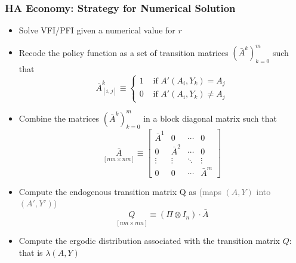 \documentclass[10pt, aspectratio=1610, natbib, handout]{beamer}
\newcommand{\dimmer}[1]{\textcolor{dimgray}{#1}}
\begin{document}
  \begin{frame}
    \frametitle{HA Economy: Strategy for Numerical Solution}

    \begin{itemize}
      \item Solve VFI/PFI given a numerical value for $r$
      \item Recode the policy function as a set of transition matrices ${(\bar{A}^k)}_{k=0}^{m}$ such that
        \begin{equation*}
          \bar{A}^k_{[i, j]} \equiv
          \begin{cases}
            1 & \text{ if } A'(A_i, Y_k) = A_j \\
            0 & \text{ if } A'(A_i, Y_k) \neq A_j
          \end{cases}
        \end{equation*}
      \item Combine the matrices ${(\bar{A}^k)}_{k=0}^{m}$ in a block diagonal matrix such that
        \begin{equation*}
          \underset{[n m \times n m]}{\bar{A}} \equiv
          \begin{bmatrix}
            \bar{A}^1 & 0 & \cdots & 0 \\
            0 & \bar{A}^2 & \cdots & 0 \\
            \vdots & \vdots & \ddots & \vdots \\
            0 & 0 & \cdots & \bar{A}^{m}
          \end{bmatrix}
        \end{equation*}
      \item Compute the endogenous transition matrix Q as \hfill\dimmer{(maps $(A, Y)$ into $(A', Y')$)}
        \begin{equation*}
          \underset{[n m \times n m]}{Q} \equiv (\Pi \otimes I_n) \cdot \bar{A}
        \end{equation*}
      \item Compute the ergodic distribution associated with the transition matrix $Q$: that is $\lambda(A, Y)$
    \end{itemize}

  \end{frame}
\end{document}
